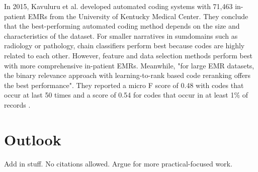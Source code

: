 \documentclass[sigconf]{acmart}
\begin{document}
In 2015, Kavuluru et al. developed automated coding systems with 71,463 in-patient EMRs from the University of Kentucky Medical Center. They conclude that the best-performing automated coding method depends on the size and characteristics of the dataset. For smaller narratives in sumdomains such as radiology or pathology, chain classifiers perform best because codes are highly related to each other. However, feature and data selection methods perform best with more comprehensive in-patient EMRs. Meanwhile, "for large EMR datasets, the binary relevance approach with learning-to-rank based code reranking offers the best performance". They reported a micro F score of 0.48 with codes that occur at last 50 times and a score of 0.54 for codes that occur in at least 1\% of records \cite{kavuluru2015empirical}.

\section{Outlook}
Add in stuff. No citations allowed. Argue for more practical-focused work.


 
\end{document}
